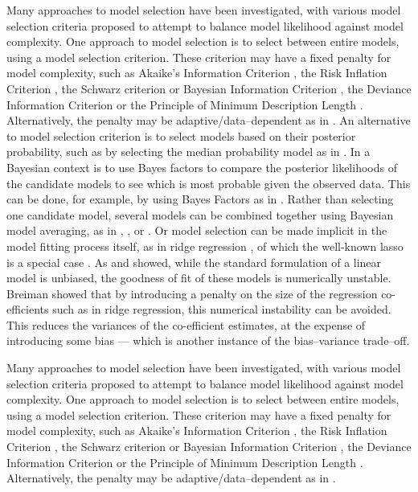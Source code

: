 \documentclass{amsart}[12pt]
\begin{document}
Many approaches to model selection have been investigated, with various model selection criteria
proposed to attempt to balance model likelihood against model complexity. One approach to model selection is
to select between entire models, using a model selection criterion. These criterion may have a fixed penalty
for model complexity, such as Akaike's Information Criterion \citep{Akaike1974}, the Risk Inflation Criterion
\citep{Foster1994}, the Schwarz criterion or Bayesian Information Criterion \citep{Schwarz1978}, the Deviance
Information Criterion \citep{Spiegelhalter2016} or the Principle of Minimum Description Length
\citep{Hansen2001}. Alternatively, the penalty may be adaptive/data--dependent as in \citep{George2000}. An
alternative to model selection criterion is to select models based on their posterior probability, such as by
selecting the median probability model as in \citep{Barbieri2004}. In a Bayesian context is to use Bayes
factors to compare the posterior likelihoods of the candidate models to see which is most probable given the
observed data. This can be done, for example, by using Bayes Factors as in \citep{Kass1993}. Rather than
selecting one candidate model, several models can be combined together using Bayesian model  averaging, as in
\citep{Hoeting1999}, \citep{Raftery1997}, \citep{Fernandez2001} or \citep{Papaspiliopoulos2016}. Or model
selection can be made implicit in the model fitting process itself, as in ridge regression \citep{Casella1980},
of which the well-known lasso is a special case \citep{Tibshirani1996}. As \citep{Breiman1996} and
\citep{Efron2013} showed, while  the standard formulation of a linear model is unbiased, the goodness of fit of
these models is numerically  unstable. Breiman showed that by introducing a penalty on the size of the
regression co- efficients such as  in ridge regression, this numerical instability can be avoided. This
reduces the variances of the co-efficient estimates, at the expense of introducing some bias --- 
which is another instance of the bias--variance trade--off.

Many approaches to model selection have been investigated, with various model selection criteria proposed to
attempt to balance model likelihood against model complexity. One approach to model selection is to select
between entire models, using a model selection criterion. These criterion may have a fixed penalty for model
complexity, such as Akaike's Information Criterion \citep{Akaike1974}, the Risk Inflation Criterion
\citep{Foster1994}, the Schwarz criterion or Bayesian Information Criterion \citep{Schwarz1978}, the Deviance
Information Criterion \citep{Spiegelhalter2016} or the Principle of Minimum Description Length
\citep{Hansen2001}. Alternatively, the penalty may be adaptive/data--dependent as in \citep{George2000}.
\end{document}
